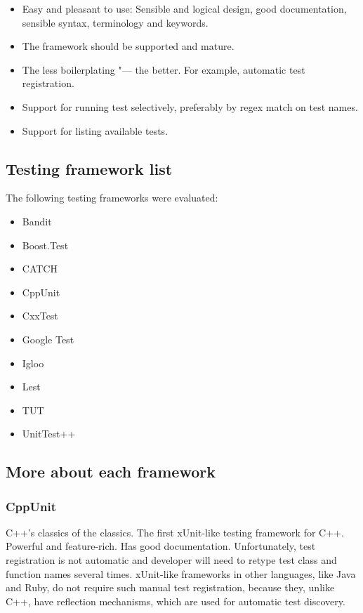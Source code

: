 \documentclass[10pt, a5paper]{article}
\begin{document}
\begin{itemize}
  \item Easy and pleasant to use: Sensible and logical design, good \linebreak documentation, sensible syntax, terminology and keywords.
  \item The framework should be supported and mature.
  \item The less boilerplating "--- the better. For example, automatic test registration.
  \item Support for running test selectively, preferably by regex match on test names.
  \item Support for listing available tests.
\end{itemize}

\subsection*{Testing framework list}

The following testing frameworks were evaluated:

\begin{itemize}
  \item Bandit
  \item Boost.Test
  \item CATCH
  \item CppUnit
  \item CxxTest
  \item Google Test
  \item Igloo
  \item Lest
  \item TUT
  \item UnitTest++
\end{itemize}

\subsection*{More about each framework}

\subsubsection*{CppUnit}

C++'s classics of the classics. The first xUnit-like testing framework for C++. Powerful and feature-rich. Has good documentation. \linebreak Unfortunately, test registration is not automatic and developer will need to retype test class and function names several times. xUnit-like frameworks in other languages, like Java and Ruby, do not require such manual test registration, because they, unlike C++, have reflection mechanisms, which are used for automatic test discovery.
\end{document}
